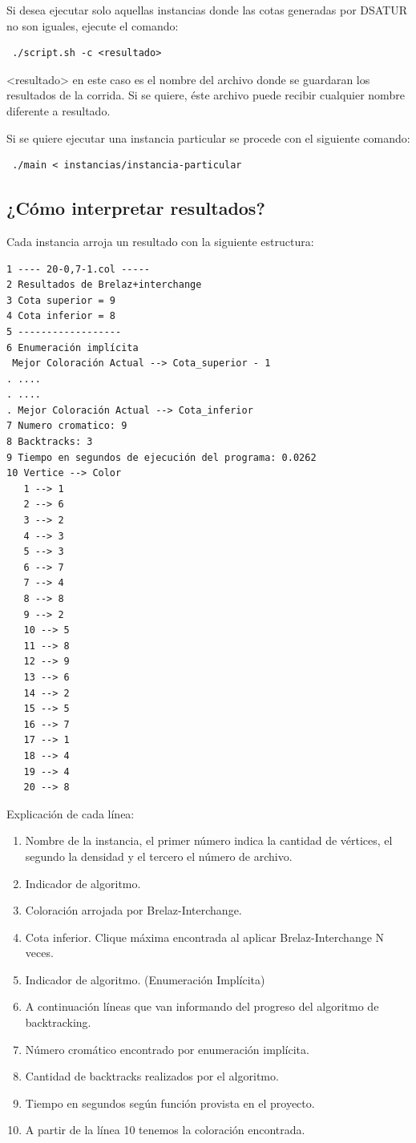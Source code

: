 \documentclass[a4paper,10pt]{article}
\begin{document}
Si desea ejecutar solo aquellas instancias donde las cotas generadas por
DSATUR no son iguales, ejecute el comando:
\begin{verbatim}
 ./script.sh -c <resultado>
\end{verbatim}

<resultado> en este caso es el nombre del archivo donde se guardaran los
resultados de la corrida. Si se quiere, éste archivo puede recibir
cualquier nombre diferente a resultado.

Si se quiere ejecutar una instancia particular se procede con el
siguiente comando:

\begin{verbatim}
 ./main < instancias/instancia-particular
\end{verbatim}

\newpage
\subsection{¿Cómo interpretar resultados?}
Cada instancia arroja un resultado con la siguiente estructura:
\begin{verbatim}
1 ---- 20-0,7-1.col -----
2 Resultados de Brelaz+interchange 
3 Cota superior = 9                
4 Cota inferior = 8                
5 ------------------               
6 Enumeración implícita            
 Mejor Coloración Actual --> Cota_superior - 1
. ....
. ....
. Mejor Coloración Actual --> Cota_inferior
7 Numero cromatico: 9              
8 Backtracks: 3                    
9 Tiempo en segundos de ejecución del programa: 0.0262
10 Vertice --> Color                
   1 --> 1                          
   2 --> 6                          
   3 --> 2                          
   4 --> 3                          
   5 --> 3                          
   6 --> 7                          
   7 --> 4
   8 --> 8
   9 --> 2
   10 --> 5
   11 --> 8
   12 --> 9
   13 --> 6
   14 --> 2 
   15 --> 5
   16 --> 7
   17 --> 1
   18 --> 4
   19 --> 4
   20 --> 8
\end{verbatim}
Explicación de cada línea:
\begin{enumerate}
 \item Nombre de la instancia, el primer número indica la cantidad de vértices, el segundo la densidad y el tercero el número de archivo.
 \item Indicador de algoritmo.
 \item Coloración arrojada por Brelaz-Interchange.
 \item Cota inferior. Clique máxima encontrada al aplicar Brelaz-Interchange N veces.
 \item Indicador de algoritmo. (Enumeración Implícita)
 \item A continuación líneas que van informando del progreso del
       algoritmo de backtracking.
 \item Número cromático encontrado por enumeración implícita.
 \item Cantidad de backtracks realizados por el algoritmo.
 \item Tiempo en segundos según función provista en el proyecto.
 \item A partir de la l\'inea 10 tenemos la coloraci\'on encontrada.
\end{enumerate}
\end{document}
